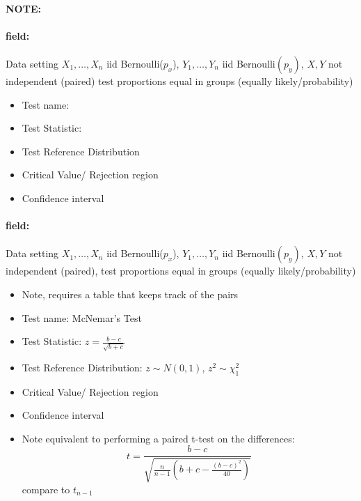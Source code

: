 \documentclass[12pt]{article}
\newenvironment{note}{\paragraph{NOTE:}}{}
\newenvironment{field}{\paragraph{field:}}{}
\begin{document}
\begin{note}
 \begin{field}
  Data setting $X_1, \ldots , X_n$ iid Bernoulli($p_x$), $Y_1, \ldots, Y_n$ iid Bernoulli$(p_y)$, $X,Y$ not independent (paired) test proportions equal in groups (equally likely/probability)
  \begin{itemize}
   \item Test name:
   \item Test Statistic:
   \item Test Reference Distribution
   \item Critical Value/ Rejection region
   \item Confidence interval
  \end{itemize}
 \end{field}
 \begin{field}
  Data setting $X_1, \ldots , X_n$ iid Bernoulli($p_x$), $Y_1, \ldots, Y_n$ iid Bernoulli$(p_y)$, $X,Y$ not independent (paired), test proportions equal in groups (equally likely/probability)
  \begin{itemize}

   \item Note, requires a table that keeps track of the pairs
   \item Test name: McNemar's Test
   \item Test Statistic: $z = \frac{b-c}{\sqrt{b+c}}$
   \item Test Reference Distribution: $z \sim N(0,1)$, $z^2 \sim \chi_1^2$
   \item Critical Value/ Rejection region
   \item Confidence interval
   \item Note equivalent to performing a paired t-test on the differences:
         $$ t = \frac{b-c}{\sqrt{\frac{n}{n-1}(b + c - \frac{(b-c)^2}{40})}} $$ compare to $t_{n-1}$
  \end{itemize}
 \end{field}
\end{note}
\end{document}
